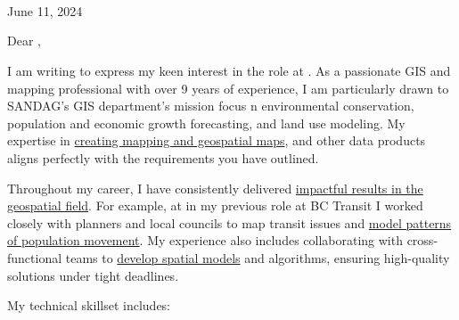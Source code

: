 \documentclass[letterpaper]{article}
\newcommand{\impt}[1]{\uline{#1}}
\begin{document}
\large
\JobManager \\
\JobManagerTitle \\
\textbf{\JobCompany} \\

\null\hfill June 11, 2024

Dear \JobManagerShort,

I am writing to express my keen interest in the
\impt{\JobTitle} role at {\JobCompany}.
As a passionate GIS and mapping professional with over 9 years of
experience, I am particularly drawn to SANDAG's GIS department's mission focus n 
environmental conservation, population and economic growth forecasting, and land use modeling.
My expertise in \impt{creating mapping and geospatial maps}, and other data products
aligns perfectly with the requirements you have outlined.

Throughout my career, I have consistently delivered
\impt{impactful results in the geospatial field}.
For example, at in my previous role at BC Transit I worked closely with
planners and local councils to map transit issues and 
\impt{model patterns of population movement}.
My experience also includes collaborating with cross-functional teams to
\impt{develop spatial models} and algorithms, ensuring high-quality solutions under tight deadlines.


\iffalse
- Collaborate with cross-functional teams,
- suitability analysis
· Organize and maintain geospatial datasets
- Design web-based and static GIS products to communicate GIS data effectively to other teams and stakeholders
· Collaborate with cross-functional teams
- Knowledge of spatial modeling techniques
- ability to manage customer relationships
- leadership and communication, and ability to meet deadlines
- Strong organization skills and ability to coordinate multiple tasks and deliverables
- build relationships, and effectively communicate
\fi

My technical skillset includes:
\end{document}
